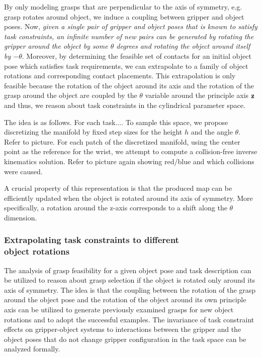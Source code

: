 \documentclass{aamas2015}
\begin{document}
By only modeling grasps that are perpendicular to the axis of symmetry, e.g. grasp
rotates around object, we induce a coupling between gripper and object poses. Now, \textit{given a
single pair of gripper and object poses that is known to satisfy task constraints, an infinite
number of new pairs can be generated by rotating the gripper around the object by some $\theta$ degrees and rotating the object
around itself by $-\theta$}. Moreover, by determining the feasible set of contacts for an initial object
pose which satisfies task requirements, we can extrapolate to a family of object rotations
and corresponding contact placements. This extrapolation is only feasible because the rotation
of the object around its axis and the rotation of the grasp around the object are coupled by 
the $\theta$ variable around the principle axis $\textbf{z}$ and thus, we reason about task
constraints in the cylindrical parameter space.

The idea is as follows. For each task.... 
To sample this space, we propose discretizing the manifold by fixed
step sizes for the height $h$ and the angle $\theta$. Refer to picture. For each patch of the
discretized manifold, using the center point  as the reference for the wrist, we attempt to compute
a collision-free inverse kinematics solution. Refer to picture again showing red/blue and which
collisions were caused. 



A crucial property of this representation is that the produced map can
be efficiently updated when the object is rotated around its axis of symmetry. More specifically, a
rotation around the z-axis corresponds to a shift along the $\theta$ dimension. 

\subsubsection{Extrapolating task constraints to different \\object rotations}

The analysis of grasp feasibility for a given object pose and task description can be utilized to reason
about grasp selection if the object is rotated only around its axis of symmetry. The idea is that the 
coupling between the rotation of the grasp around the object pose and the rotation of the object around
its own principle axis can be utilized to generate previously examined grasps for new object rotations
and to adopt the successful examples. The invariance of task constraint effects on gripper-object
systems to interactions between the gripper and the object poses that do not change gripper configuration
in the task space can be analyzed formally. 
\end{document}
